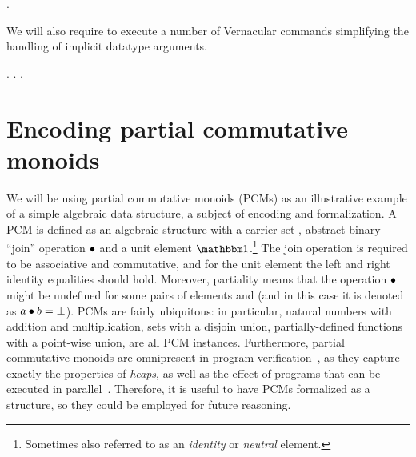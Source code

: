 \begin{coqdoccode}
\coqdocemptyline
\coqdocnoindent
{} \coqdoceol
\coqdocnoindent
{}      .\coqdoceol
\coqdocemptyline
\coqdocemptyline
\end{coqdoccode}


We will also require to execute a number of Vernacular commands
simplifying the handling of implicit datatype arguments.




\begin{coqdoccode}
\coqdocemptyline
\coqdocnoindent
{}.\coqdoceol
\coqdocnoindent
{}  .\coqdoceol
\coqdocnoindent
{}   .\coqdoceol
\coqdocemptyline
\end{coqdoccode}


\section{Encoding partial commutative monoids}


\label{sec:pcms}




We will be using partial commutative monoids (PCMs) as an illustrative
example of a simple algebraic data structure, a subject of encoding
and formalization. A PCM is defined as an algebraic structure with a
carrier set , abstract binary ``join'' operation $\bullet$ and a unit
element $\unit$.\footnote{Sometimes also referred to as an
\emph{identity} or \emph{neutral} element.}
 The join operation is required to be
associative and commutative, and for the unit element the left and
right identity equalities should hold. Moreover, partiality means that
the operation $\bullet$ might be undefined for some pairs of elements
 and  (and in this case it is denoted as $a \bullet b =
\bot$). PCMs are fairly ubiquitous: in particular, natural numbers
with addition and multiplication, sets with a disjoin union,
partially-defined functions with a point-wise union, are all PCM
instances. Furthermore, partial commutative monoids are omnipresent in
program verification~\cite{Nanevski-al:POPL10}, as they capture
exactly the properties of \textit{heaps}, as well as the effect of programs
that can be executed in
parallel~\cite{Nanevski-al:ESOP14}. Therefore, it is useful to have
PCMs formalized as a structure, so they could be employed for future
reasoning.


